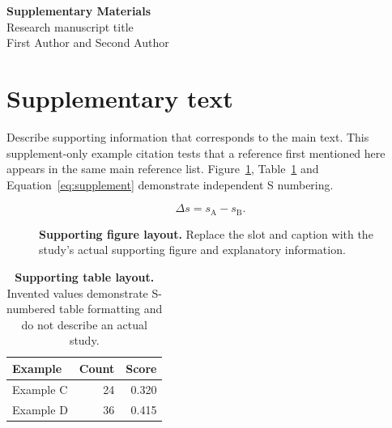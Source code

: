 \documentclass[12pt]{article}
\begin{document}
\clearpage
\setcounter{figure}{0}
\setcounter{table}{0}
\setcounter{equation}{0}
\setcounter{page}{1}
\renewcommand{\thefigure}{S\arabic{figure}}
\renewcommand{\thetable}{S\arabic{table}}
\renewcommand{\theequation}{S\arabic{equation}}
\renewcommand{\thepage}{S\arabic{page}}

\begin{center}
\Large\textbf{Supplementary Materials}\\[0.5em]
\normalsize Research manuscript title\\
First Author and Second Author
\end{center}

\section*{Supplementary text}
Describe supporting information that corresponds to the main text. This
supplement-only example citation\cite{sandve2013ten} tests that a
reference first mentioned here appears in the same main reference list.
Figure~\ref{fig:supplement}, Table~\ref{tab:supplement} and
Equation~\ref{eq:supplement} demonstrate independent S numbering.

\begin{equation}
\Delta s=s_{\mathrm{A}}-s_{\mathrm{B}}.
\label{eq:supplement}
\end{equation}

\begin{figure}[htbp]
\centering
{}
\caption{\textbf{Supporting figure layout.} Replace the slot and caption with
the study's actual supporting figure and explanatory information.}
\label{fig:supplement}
\end{figure}

\begin{table}[htbp]
\centering
\caption{\textbf{Supporting table layout.} Invented values demonstrate
S-numbered table formatting and do not describe an actual study.}
\label{tab:supplement}
\begin{tabular}{lrr}
\hline
Example & Count & Score\\
\hline
Example C & 24 & 0.320\\
Example D & 36 & 0.415\\
\hline
\end{tabular}
\end{table}

\end{document}
